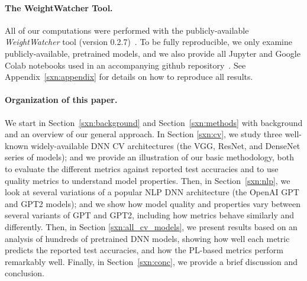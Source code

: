 \paragraph{The WeightWatcher Tool.}

All of our computations were performed with the publicly-available \emph{WeightWatcher} tool (version 0.2.7)~\cite{weightwatcher_package}.
To be fully reproducible, we only examine publicly-available, pretrained models, and we also provide all Jupyter and Google Colab notebooks used in an accompanying github repository~\cite{kdd20_sub_repo}.
See Appendix~\ref{sxn:appendix} for details on how to reproduce all results.


\paragraph{Organization of this paper.}

We start in Section~\ref{sxn:background} and Section~\ref{sxn:methods} with background and an overview of our general approach.
In Section \ref{sxn:cv}, we study three well-known widely-available DNN CV architectures (the VGG, ResNet, and DenseNet series of models); and we provide an illustration of our basic methodology, both to evaluate the different metrics against reported test accuracies and to use quality metrics to understand model properties.
Then, in Section~\ref{sxn:nlp}, we look at several variations of a popular NLP DNN architecture (the OpenAI GPT and GPT2 models); and we show how model quality and properties vary between several variants of GPT and GPT2, including how metrics behave similarly and differently.
Then, in Section \ref{sxn:all_cv_models}, we present results based on an analysis of hundreds of pretrained DNN models, showing how well each metric predicts the reported test accuracies, and how the PL-based metrics perform remarkably well.
Finally, in Section~\ref{sxn:conc}, we provide a brief discussion and conclusion.



